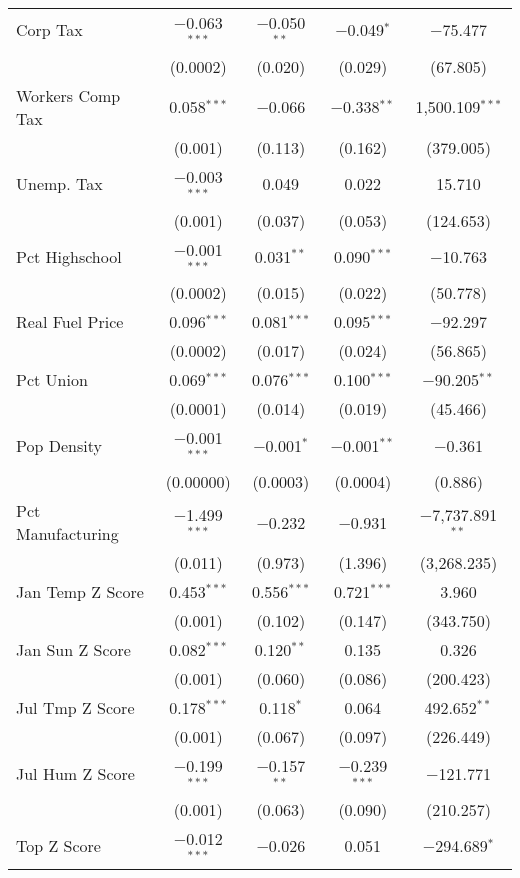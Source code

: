 \begin{table}[!htbp]
\begin{tabular}{@{\extracolsep{5pt}}lcccc}
  Corp Tax & $-$0.063$^{***}$ & $-$0.050$^{**}$ & $-$0.049$^{*}$ & $-$75.477 \\ 
  & (0.0002) & (0.020) & (0.029) & (67.805) \\ 
  Workers Comp Tax & 0.058$^{***}$ & $-$0.066 & $-$0.338$^{**}$ & 1,500.109$^{***}$ \\ 
  & (0.001) & (0.113) & (0.162) & (379.005) \\ 
  Unemp. Tax & $-$0.003$^{***}$ & 0.049 & 0.022 & 15.710 \\ 
  & (0.001) & (0.037) & (0.053) & (124.653) \\ 
  Pct Highschool & $-$0.001$^{***}$ & 0.031$^{**}$ & 0.090$^{***}$ & $-$10.763 \\ 
  & (0.0002) & (0.015) & (0.022) & (50.778) \\ 
  Real Fuel Price & 0.096$^{***}$ & 0.081$^{***}$ & 0.095$^{***}$ & $-$92.297 \\ 
  & (0.0002) & (0.017) & (0.024) & (56.865) \\ 
  Pct Union & 0.069$^{***}$ & 0.076$^{***}$ & 0.100$^{***}$ & $-$90.205$^{**}$ \\ 
  & (0.0001) & (0.014) & (0.019) & (45.466) \\ 
  Pop Density & $-$0.001$^{***}$ & $-$0.001$^{*}$ & $-$0.001$^{**}$ & $-$0.361 \\ 
  & (0.00000) & (0.0003) & (0.0004) & (0.886) \\ 
  Pct Manufacturing & $-$1.499$^{***}$ & $-$0.232 & $-$0.931 & $-$7,737.891$^{**}$ \\ 
  & (0.011) & (0.973) & (1.396) & (3,268.235) \\ 
  Jan Temp Z Score & 0.453$^{***}$ & 0.556$^{***}$ & 0.721$^{***}$ & 3.960 \\ 
  & (0.001) & (0.102) & (0.147) & (343.750) \\ 
  Jan Sun Z Score & 0.082$^{***}$ & 0.120$^{**}$ & 0.135 & 0.326 \\ 
  & (0.001) & (0.060) & (0.086) & (200.423) \\ 
  Jul Tmp Z Score & 0.178$^{***}$ & 0.118$^{*}$ & 0.064 & 492.652$^{**}$ \\ 
  & (0.001) & (0.067) & (0.097) & (226.449) \\ 
  Jul Hum Z Score & $-$0.199$^{***}$ & $-$0.157$^{**}$ & $-$0.239$^{***}$ & $-$121.771 \\ 
  & (0.001) & (0.063) & (0.090) & (210.257) \\ 
  Top Z Score & $-$0.012$^{***}$ & $-$0.026 & 0.051 & $-$294.689$^{*}$ \\ 

\end{tabular}
\end{table}
